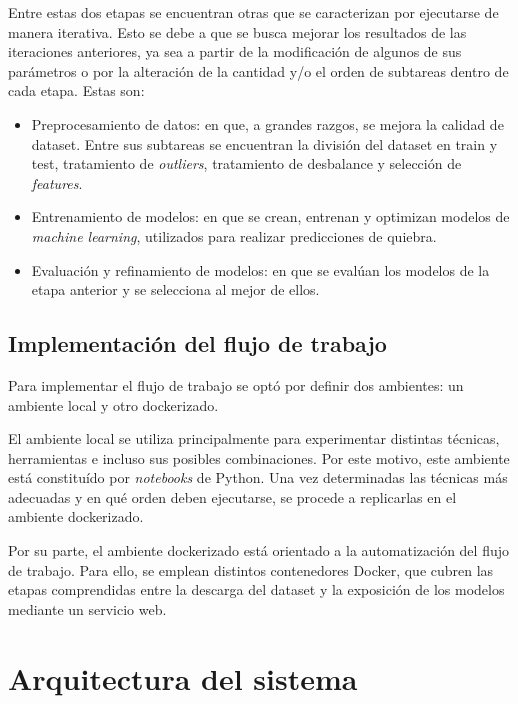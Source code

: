 Entre estas dos etapas se encuentran otras que se caracterizan por ejecutarse de manera iterativa. Esto se debe a que se busca mejorar los resultados de las iteraciones anteriores, ya sea a partir de la modificación de algunos de sus parámetros o por la alteración de la cantidad y/o el orden de subtareas dentro de cada etapa. Estas son:

\begin{itemize}
    \item Preprocesamiento de datos: en que, a grandes razgos, se mejora la calidad de dataset. Entre sus subtareas se encuentran la división del dataset en train y test, tratamiento de \textit{outliers}, tratamiento de desbalance y selección de \textit{features}.
    \item Entrenamiento de modelos: en que se crean, entrenan y optimizan modelos de \textit{machine learning}, utilizados para realizar predicciones de quiebra.
    \item Evaluación y refinamiento de modelos: en que se evalúan los modelos de la etapa anterior y se selecciona al mejor de ellos.
\end{itemize}

\subsection{Implementación del flujo de trabajo}

Para implementar el flujo de trabajo se optó por definir dos ambientes: un ambiente local y otro dockerizado.

El ambiente local se utiliza principalmente para experimentar distintas técnicas, herramientas e incluso sus posibles combinaciones. Por este motivo, este ambiente está constituído por \textit{notebooks} de Python. Una vez determinadas las técnicas más adecuadas y en qué orden deben ejecutarse, se procede a replicarlas en el ambiente dockerizado.

Por su parte, el ambiente dockerizado está orientado a la automatización del flujo de trabajo. Para ello, se emplean distintos contenedores Docker, que cubren las etapas comprendidas entre la descarga del dataset y la exposición de los modelos mediante un servicio web.

\section{Arquitectura del sistema}


